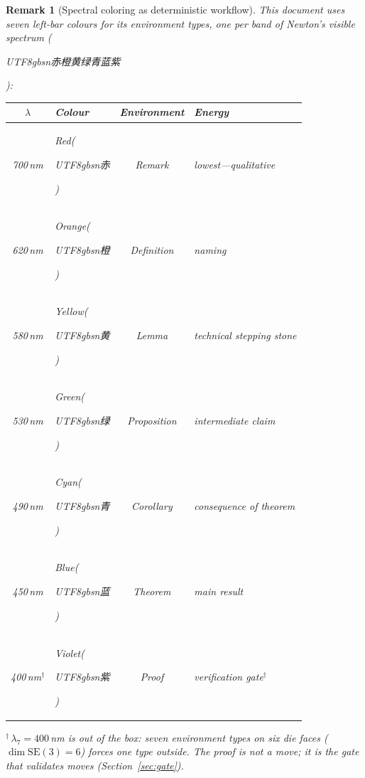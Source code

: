 \documentclass[11pt,a4paper]{article}
\newtheorem{remark}[theorem]{Remark}
\begin{document}
\begin{remark}[Spectral coloring as deterministic workflow]%
\label{rem:spectral-workflow}
This document uses seven left-bar colours for its
environment types, one per band of Newton's visible spectrum
(\begin{CJK}{UTF8}{gbsn}赤橙黄绿青蓝紫\end{CJK}):
%
\begin{center}
\small
\begin{tabular}{@{}clcl@{}}
\toprule
$\lambda$ & Colour & Environment & Energy \\
\midrule
\textcolor{specRed}{700\,nm} & \textcolor{specRed}{Red\;(\begin{CJK}{UTF8}{gbsn}赤\end{CJK})}
        & Remark      & lowest---qualitative \\
\textcolor{specOrange}{620\,nm} & \textcolor{specOrange}{Orange\;(\begin{CJK}{UTF8}{gbsn}橙\end{CJK})}
        & Definition  & naming \\
\textcolor{specYellow}{580\,nm} & \textcolor{specYellow}{Yellow\;(\begin{CJK}{UTF8}{gbsn}黄\end{CJK})}
        & Lemma       & technical stepping stone \\
\textcolor{specGreen}{530\,nm} & \textcolor{specGreen}{Green\;(\begin{CJK}{UTF8}{gbsn}绿\end{CJK})}
        & Proposition & intermediate claim \\
\textcolor{specCyan}{490\,nm} & \textcolor{specCyan}{Cyan\;(\begin{CJK}{UTF8}{gbsn}青\end{CJK})}
        & Corollary   & consequence of theorem \\
\textcolor{specBlue}{450\,nm} & \textcolor{specBlue}{Blue\;(\begin{CJK}{UTF8}{gbsn}蓝\end{CJK})}
        & Theorem     & main result \\
\textcolor{specViolet}{400\,nm}$^{\dagger}$ & \textcolor{specViolet}{Violet\;(\begin{CJK}{UTF8}{gbsn}紫\end{CJK})}
        & Proof       & verification gate$^{\dagger}$ \\
\bottomrule
\end{tabular}
\end{center}
%
\noindent
{\small $^{\dagger}$\,$\lambda_7 = 400$\,nm is \emph{out of the box}:
seven environment types on six die faces
($\dim\mathrm{SE}(3) = 6$) forces one type outside.
The proof is not a move; it is the \emph{gate}
that validates moves (Section~\ref{sec:gate}).}


\end{remark}
\end{document}
